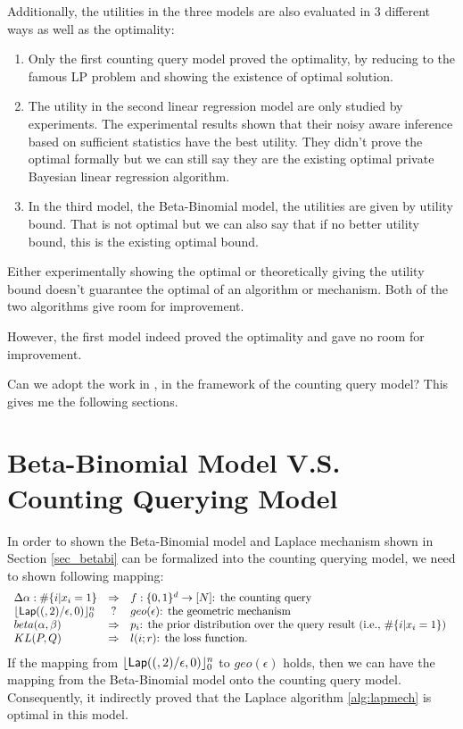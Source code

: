\documentclass{article}
\begin{document}
Additionally, the utilities in the three models are also evaluated in 3 different ways as well as the optimality:
\begin{enumerate} 
\item Only the first counting query model proved the optimality,
by reducing to the famous LP problem and showing the existence of optimal solution.
%
\item The utility in the second linear regression model are only studied by experiments. 
The experimental results shown that their noisy aware inference based on sufficient statistics have the best utility.
They didn't prove the optimal formally but we can still say they are the existing optimal private Bayesian linear regression algorithm.
%
\item In the third model, the Beta-Binomial model, the utilities are given by utility bound. That is not optimal but we can also say that if no better utility bound, this is the existing optimal bound.
\end{enumerate}
%

Either experimentally showing the optimal \cite{bernstein2019differentially} or 
theoretically giving the utility bound \cite{zhang2016differential} doesn't guarantee the optimal of an algorithm or mechanism.
Both of the two algorithms give room for improvement.

However, the first model indeed proved the optimality and gave no room for improvement.

Can we adopt the work in \cite{bernstein2019differentially}, \cite{zhang2016differential}
in the framework of the counting query model?
This gives me the following sections.

%

\section{Beta-Binomial Model V.S. Counting Querying Model}
In order to shown the Beta-Binomial model and Laplace mechanism shown in Section \ref{sec_betabi} can be 
formalized into the counting querying model, we need to shown following mapping:
\[
	\begin{array}{lcl}
	\Delta \alpha : \#\{i |x_i = 1\}
	& \Rightarrow &
	f:\{0, 1\}^d \rightarrow [N] \mbox{: the counting query}\\
	\lfloor \mathsf{Lap}((, 2)/\epsilon, 0) \rfloor_0^{n}
	& ? &
	geo(\epsilon) \mbox{: the geometric mechanism}\\
	beta(\alpha, \beta)
	& \Rightarrow &
	p_{i} \mbox{: the prior distribution over the query result (i.e., $\#\{i |x_i = 1\}$) }\\
	KL(P, Q)
	& \Rightarrow &
	l(i; r) \mbox{: the loss function.}
	\end{array}
\]
If the mapping from $\lfloor \mathsf{Lap}((, 2)/\epsilon, 0) \rfloor_0^{n}$ to $geo(\epsilon) $ holds, then we can have the mapping from the Beta-Binomial model onto the counting query model.
Consequently, 
it indirectly proved that the Laplace algorithm \ref{alg:lapmech} is optimal in this model.
\end{document}
